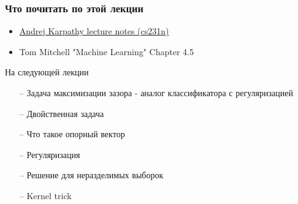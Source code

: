 \documentclass[10pt]{beamer}
\begin{document}
\appendix

\begin{frame}\frametitle{Что почитать по этой лекции}
  \begin{itemize}
    \item \href{http://cs231n.github.io/neural-networks-1/}{Andrej Karpathy lecture notes (cs231n)}
    \item Tom Mitchell "Machine Learning" Chapter 4.5
  \end{itemize}
\end{frame}

\begin{frame}{На следующей лекции}
	\begin{itemize}
	  	\item[--] Задача максимизации зазора - аналог классификатора с регуляризацией
    \item[--] Двойственная задача 
    \item[--] Что такое опорный вектор
    \item[--] Регуляризация
    \item[--] Решение для неразделимых выборок
    \item[--] Kernel trick    
	\end{itemize}
\end{frame}
\end{document}
